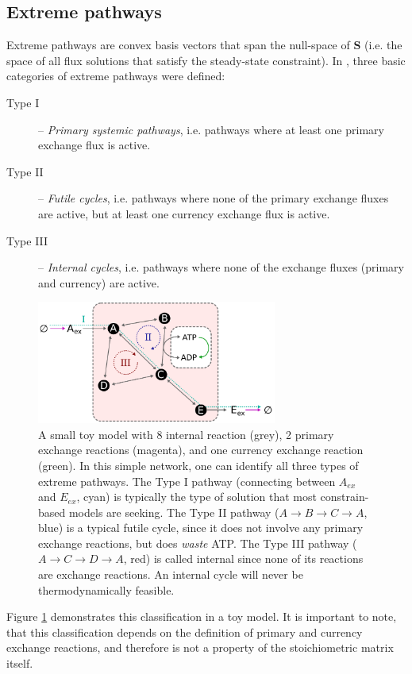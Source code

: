 \documentclass[twocolumn]{bmcart}%
\begin{document}
\subsection*{Extreme pathways}
Extreme pathways are convex basis vectors that span the null-space of $\mathbf{S}$ (i.e. the space of all flux solutions that satisfy the steady-state constraint). In \cite{Schilling2000-rn, Beard2002-xt}, three basic categories of extreme pathways were defined:
\begin{description}
\item[Type I] -- \textit{Primary systemic pathways}, i.e. pathways where at least one primary exchange flux is active.
\item[Type II] -- \textit{Futile cycles}, i.e. pathways where none of the primary exchange fluxes are active, but at least one currency exchange flux is active.
\item[Type III] -- \textit{Internal cycles}, i.e. pathways where none of the exchange fluxes (primary and currency) are active.
\end{description}

\begin{figure}[h!]
	\includegraphics[width=3.1in]{figure1.pdf}
	\caption{
		A small toy model with 8 internal reaction (grey), 2 primary exchange reactions (magenta), and one currency exchange reaction (green). In this simple network, one can identify all three types of extreme pathways. The Type I pathway (connecting between $A_{ex}$ and $E_{ex}$, cyan) is typically the type of solution that most constrain-based models are seeking. The Type II pathway ($A \rightarrow B \rightarrow C \rightarrow A$, blue) is a typical futile cycle, since it does not involve any primary exchange reactions, but does \emph{waste} ATP. The Type III pathway ($A \rightarrow C \rightarrow D \rightarrow A$, red) is called internal since none of its reactions are exchange reactions. An internal cycle will never be thermodynamically feasible.}
    \label{fig:cycles}
\end{figure}
Figure \ref{fig:cycles} demonstrates this classification in a toy model. It is important to note, that this classification depends on the definition of primary and currency exchange reactions, and therefore is not a property of the stoichiometric matrix itself.
\end{document}
